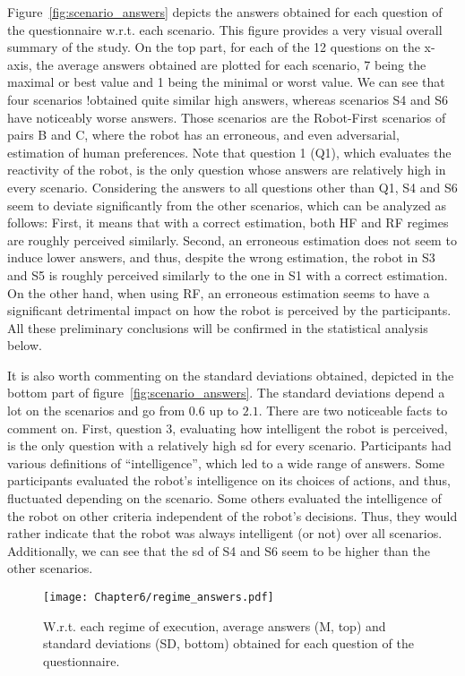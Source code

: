 Figure~\ref{fig:scenario_answers} depicts the answers obtained for each question of the questionnaire w.r.t. each scenario. This figure provides a very visual overall summary of the study. On the top part, for each of the 12 questions on the x-axis, the average answers obtained are plotted for each scenario, 7 being the maximal or best value and 1 being the minimal or worst value. 
We can see that four scenarios !obtained quite similar high answers, whereas scenarios S4 and S6 have noticeably worse answers. Those scenarios are the Robot-First scenarios of pairs B and C, where the robot has an erroneous, and even adversarial, estimation of human preferences. 
Note that question 1 (Q1), which evaluates the reactivity of the robot, is the only question whose answers are relatively high in every scenario.
Considering the answers to all questions other than Q1, S4 and S6 seem to deviate significantly from the other scenarios, which can be analyzed as follows:
First, it means that with a correct estimation, both HF and RF regimes are roughly perceived similarly. 
Second, an erroneous estimation does not seem to induce lower answers, and thus, despite the wrong estimation, the robot in S3 and S5 is roughly perceived similarly to the one in S1 with a correct estimation.
On the other hand, when using RF, an erroneous estimation seems to have a significant detrimental impact on how the robot is perceived by the participants.
All these preliminary conclusions will be confirmed in the statistical analysis below.

It is also worth commenting on the standard deviations obtained, depicted in the bottom part of figure~\ref{fig:scenario_answers}. The standard deviations depend a lot on the scenarios and go from $0.6$ up to $2.1$. There are two noticeable facts to comment on.
First, question 3, evaluating how intelligent the robot is perceived, is the only question with a relatively high \acrshort{sd} for every scenario. Participants had various definitions of ``intelligence'', which led to a wide range of answers. Some participants evaluated the robot's intelligence on its choices of actions, and thus, fluctuated depending on the scenario. Some others evaluated the intelligence of the robot on other criteria independent of the robot's decisions. Thus, they would rather indicate that the robot was always intelligent (or not) over all scenarios.
Additionally, we can see that the \acrshort{sd} of S4 and S6 seem to be higher than the other scenarios.

\begin{figure}[h]
    \center
    \texttt{[image: Chapter6/regime\_answers.pdf]}
    \caption{W.r.t. each regime of execution, average answers (M, top) and standard deviations (SD, bottom) obtained for each question of the questionnaire.}
    \label{fig:regime_answers}
\end{figure}


